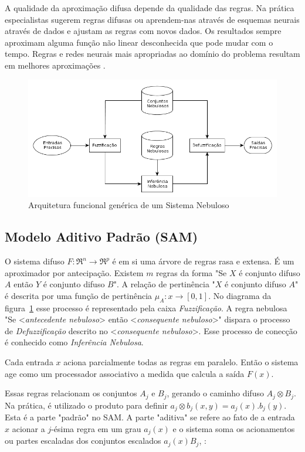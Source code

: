 A qualidade da aproximação difusa depende da qualidade das regras. Na prática especialistas sugerem regras
difusas ou aprendem-nas através de esquemas neurais através de dados e ajustam as regras com novos dados.
Os resultados sempre aproximam alguma função não linear desconhecida que pode mudar com o tempo. Regras e redes neurais mais apropriadas ao domínio do problema resultam em melhores aproximações \cite{kosko1997fuzzy}.

\begin{figure}
  \includegraphics[width=15cm]{imgs/arquitetura_fuzzy}
  \caption{Arquitetura funcional genérica de um Sistema Nebuloso \cite{passos2005datamining}}
  \label{arq_fuzzy}
\end{figure}

\subsection{Modelo Aditivo Padrão (SAM)}

O sistema difuso $F:\Re^n \rightarrow \Re^p$ é em si uma árvore de regras rasa e extensa. É um aproximador
por antecipação. Existem $m$ regras da forma "Se $X$ é conjunto difuso $A$ então $Y$ é conjunto difuso $B$".
A relação de pertinência "$X$ é conjunto difuso $A$" é descrita por uma função de pertinência
$\mu_A: x \longrightarrow [0,1]$. No diagrama da figura~\ref{arq_fuzzy} esse processo é representado pela
caixa \emph{Fuzzificação}. A regra nebulosa "Se <\textit{antecedente nebuloso}> então <\textit{consequente nebuloso}>" dispara
o processo de \emph{Defuzzificação} descrito no <\textit{consequente nebuloso}>. Esse processo de conecção é conhecido como
\emph{Inferência Nebulosa}.

Cada entrada $x$ aciona parcialmente todas as regras em paralelo. Então o sistema age como um processador 
associativo a medida que calcula a saída $F(x)$.

Essas regras relacionam os conjuntos $A_j$ e $B_j$, gerando o caminho difuso $A_j \otimes B_j$. Na prática,
é utilizado o produto para definir $ a_j \otimes b_j (x,y) = a_j(x).b_j(y)$. Esta é a parte "padrão" no SAM\@.
A parte "aditiva" se refere ao fato de a entrada $x$ acionar a $j$-ésima regra em um grau $a_j(x)$ e o sistema 
soma os acionamentos ou partes escaladas dos conjuntos escalados $a_j(x)B_j$, \cite{kosko1997fuzzy}:

